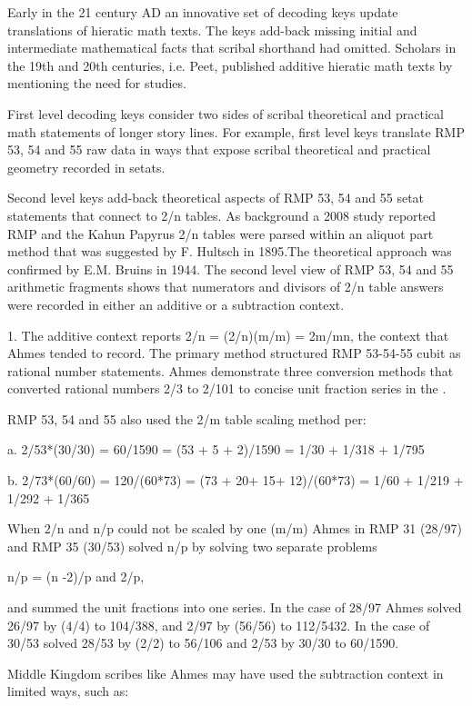 \documentclass[12pt]{article}
\begin{document}
Early in the 21 century AD an innovative set of decoding keys update translations of hieratic math texts. The keys add-back missing initial and intermediate mathematical facts that scribal shorthand had omitted. Scholars in the 19th and 20th centuries, i.e. Peet, published additive hieratic math texts by mentioning the need for  studies.

First level decoding keys consider two sides of scribal theoretical and practical math statements of longer story lines. For example, first level keys translate RMP 53, 54 and 55 raw data in ways that expose scribal theoretical and practical geometry recorded in setats.

Second level keys add-back theoretical aspects of RMP 53, 54 and 55 setat statements that connect to 2/n tables. As background a 2008 study reported RMP and the Kahun Papyrus 2/n tables were parsed within an aliquot part method that was suggested by F. Hultsch in 1895.The theoretical approach was confirmed by E.M. Bruins in 1944. The second level view of RMP 53, 54 and 55 arithmetic fragments shows that numerators and divisors of 2/n table answers were recorded in either an additive or a subtraction context.

1. The additive context reports 2/n = (2/n)(m/m) = 2m/mn, the context that Ahmes tended to record. The primary method structured RMP 53-54-55 cubit as rational number statements. Ahmes demonstrate three conversion methods that converted rational numbers 2/3 to 2/101 to concise unit fraction series in the . 

RMP 53, 54 and 55 also used the 2/m table scaling method per: 

a. 2/53*(30/30) = 60/1590 = (53 + 5 + 2)/1590 = 1/30 + 1/318 + 1/795

b. 2/73*(60/60) = 120/(60*73) = (73 + 20+ 15+ 12)/(60*73) = 1/60 + 1/219 + 1/292 + 1/365

When 2/n and n/p could not be scaled by one (m/m) Ahmes in RMP 31 (28/97) and RMP 35 (30/53) solved n/p by solving two separate problems 

n/p = (n -2)/p and 2/p, 

and summed the unit fractions into one series. In the case of 28/97 Ahmes solved 26/97 by (4/4) to 104/388, and 2/97 by (56/56) to 112/5432. In the case of 30/53 solved 28/53 by (2/2) to 56/106 and 2/53 by 30/30 to 60/1590.     

Middle Kingdom scribes like Ahmes may have used the subtraction context in limited ways, such as:
\end{document}
